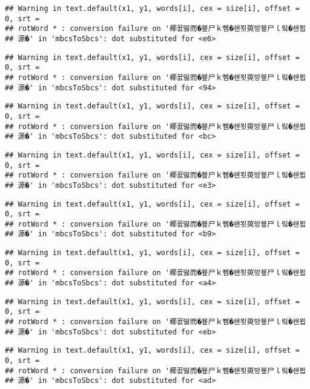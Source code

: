 \documentclass[]{article}
\begin{document}
\begin{verbatim}
## Warning in text.default(x1, y1, words[i], cex = size[i], offset = 0, srt =
## rotWord * : conversion failure on '椰꾨떯而�뵾尸ｋ뻼�쇈묏萸방뵾尸ｌ맄�쇈묍
## 源�' in 'mbcsToSbcs': dot substituted for <e6>
\end{verbatim}

\begin{verbatim}
## Warning in text.default(x1, y1, words[i], cex = size[i], offset = 0, srt =
## rotWord * : conversion failure on '椰꾨떯而�뵾尸ｋ뻼�쇈묏萸방뵾尸ｌ맄�쇈묍
## 源�' in 'mbcsToSbcs': dot substituted for <94>
\end{verbatim}

\begin{verbatim}
## Warning in text.default(x1, y1, words[i], cex = size[i], offset = 0, srt =
## rotWord * : conversion failure on '椰꾨떯而�뵾尸ｋ뻼�쇈묏萸방뵾尸ｌ맄�쇈묍
## 源�' in 'mbcsToSbcs': dot substituted for <bc>
\end{verbatim}

\begin{verbatim}
## Warning in text.default(x1, y1, words[i], cex = size[i], offset = 0, srt =
## rotWord * : conversion failure on '椰꾨떯而�뵾尸ｋ뻼�쇈묏萸방뵾尸ｌ맄�쇈묍
## 源�' in 'mbcsToSbcs': dot substituted for <e3>
\end{verbatim}

\begin{verbatim}
## Warning in text.default(x1, y1, words[i], cex = size[i], offset = 0, srt =
## rotWord * : conversion failure on '椰꾨떯而�뵾尸ｋ뻼�쇈묏萸방뵾尸ｌ맄�쇈묍
## 源�' in 'mbcsToSbcs': dot substituted for <b9>
\end{verbatim}

\begin{verbatim}
## Warning in text.default(x1, y1, words[i], cex = size[i], offset = 0, srt =
## rotWord * : conversion failure on '椰꾨떯而�뵾尸ｋ뻼�쇈묏萸방뵾尸ｌ맄�쇈묍
## 源�' in 'mbcsToSbcs': dot substituted for <a4>
\end{verbatim}

\begin{verbatim}
## Warning in text.default(x1, y1, words[i], cex = size[i], offset = 0, srt =
## rotWord * : conversion failure on '椰꾨떯而�뵾尸ｋ뻼�쇈묏萸방뵾尸ｌ맄�쇈묍
## 源�' in 'mbcsToSbcs': dot substituted for <eb>
\end{verbatim}

\begin{verbatim}
## Warning in text.default(x1, y1, words[i], cex = size[i], offset = 0, srt =
## rotWord * : conversion failure on '椰꾨떯而�뵾尸ｋ뻼�쇈묏萸방뵾尸ｌ맄�쇈묍
## 源�' in 'mbcsToSbcs': dot substituted for <ad>
\end{verbatim}
\end{document}
